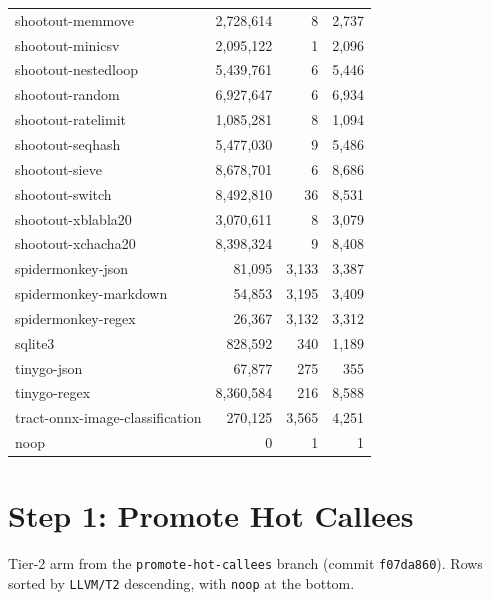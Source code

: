 \begin{longtable}{l r r r}
shootout-memmove & 2{,}728{,}614 & 8 & 2{,}737 \\
shootout-minicsv & 2{,}095{,}122 & 1 & 2{,}096 \\
shootout-nestedloop & 5{,}439{,}761 & 6 & 5{,}446 \\
shootout-random & 6{,}927{,}647 & 6 & 6{,}934 \\
shootout-ratelimit & 1{,}085{,}281 & 8 & 1{,}094 \\
shootout-seqhash & 5{,}477{,}030 & 9 & 5{,}486 \\
shootout-sieve & 8{,}678{,}701 & 6 & 8{,}686 \\
shootout-switch & 8{,}492{,}810 & 36 & 8{,}531 \\
shootout-xblabla20 & 3{,}070{,}611 & 8 & 3{,}079 \\
shootout-xchacha20 & 8{,}398{,}324 & 9 & 8{,}408 \\
spidermonkey-json & 81{,}095 & 3{,}133 & 3{,}387 \\
spidermonkey-markdown & 54{,}853 & 3{,}195 & 3{,}409 \\
spidermonkey-regex & 26{,}367 & 3{,}132 & 3{,}312 \\
sqlite3 & 828{,}592 & 340 & 1{,}189 \\
tinygo-json & 67{,}877 & 275 & 355 \\
tinygo-regex & 8{,}360{,}584 & 216 & 8{,}588 \\
tract-onnx-image-classification & 270{,}125 & 3{,}565 & 4{,}251 \\
noop & 0 & 1 & 1 \\
\end{longtable}

\section{Step 1: Promote Hot Callees}
\label{sec:appB:step1}

Tier-2 arm from the \texttt{promote-hot-callees} branch (commit \texttt{f07da860}). Rows sorted by \texttt{LLVM/T2} descending, with \texttt{noop} at the bottom.

